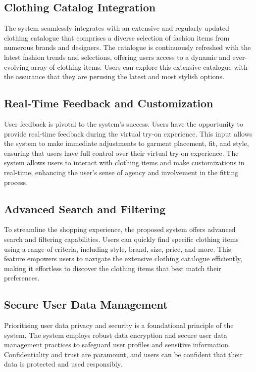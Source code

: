 	\subsection*{Clothing Catalog Integration}
		The system seamlessly integrates with an extensive and regularly updated clothing catalogue that comprises a diverse selection of fashion items from numerous brands and designers. The catalogue is continuously refreshed with the latest fashion trends and selections, offering users access to a dynamic and ever-evolving array of clothing items. Users can explore this extensive catalogue with the assurance that they are perusing the latest and most stylish options.

	\subsection*{Real-Time Feedback and Customization}
		User feedback is pivotal to the system's success. Users have the opportunity to provide real-time feedback during the virtual try-on experience. This input allows the system to make immediate adjustments to garment placement, fit, and style, ensuring that users have full control over their virtual try-on experience. The system allows users to interact with clothing items and make customizations in real-time, enhancing the user's sense of agency and involvement in the fitting process.

	\subsection*{Advanced Search and Filtering}
		To streamline the shopping experience, the proposed system offers advanced search and filtering capabilities. Users can quickly find specific clothing items using a range of criteria, including style, brand, size, price, and more. This feature empowers users to navigate the extensive clothing catalogue efficiently, making it effortless to discover the clothing items that best match their preferences.

	\subsection*{Secure User Data Management}
		Prioritising user data privacy and security is a foundational principle of the system. The system employs robust data encryption and secure user data management practices to safeguard user profiles and sensitive information. Confidentiality and trust are paramount, and users can be confident that their data is protected and used responsibly.

